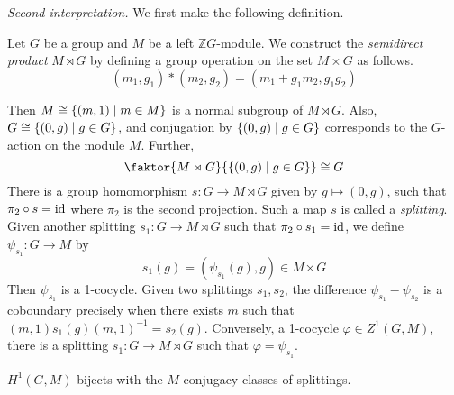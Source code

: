 \emph{Second interpretation.}
We first make the following definition.
\begin{definition}
    Let \( G \) be a group and \( M \) be a left \( \mathbb Z G \)-module.
    We construct the \emph{semidirect product} \( M \rtimes G \) by defining a group operation on the set \( M \times G \) as follows.
    \[ (m_1, g_1) \ast (m_2, g_2) = (m_1 + g_1 m_2, g_1 g_2) \]
\end{definition}
Then \( M \cong \qty{(m, 1) \mid m \in M} \) is a normal subgroup of \( M \rtimes G \).
Also, \( G \cong \qty{(0, g) \mid g \in G} \), and conjugation by \( \qty{(0, g) \mid g \in G} \) corresponds to the \( G \)-action on the module \( M \).
Further,
\[ \faktor{M \rtimes G}{\qty{(0, g) \mid g \in G}} \cong G \]
There is a group homomorphism \( s : G \to M \rtimes G \) given by \( g \mapsto (0, g) \), such that \( \pi_2 \circ s = \operatorname{id} \) where \( \pi_2 \) is the second projection.
Such a map \( s \) is called a \emph{splitting}.
Given another splitting \( s_1 : G \to M \rtimes G \) such that \( \pi_2 \circ s_1 = \operatorname{id} \), we define \( \psi_{s_1} : G \to M \) by
\[ s_1(g) = (\psi_{s_1}(g), g) \in M \rtimes G \]
Then \( \psi_{s_1} \) is a 1-cocycle.
Given two splittings \( s_1, s_2 \), the difference \( \psi_{s_1} - \psi_{s_2} \) is a coboundary precisely when there exists \( m \) such that \( (m, 1)s_1(g)(m,1)^{-1} = s_2(g) \).
Conversely, a 1-cocycle \( \varphi \in Z^1(G, M) \), there is a splitting \( s_1 : G \to M \rtimes G \) such that \( \varphi = \psi_{s_1} \).
\begin{theorem}
    \( H^1(G, M) \) bijects with the \( M \)-conjugacy classes of splittings.
\end{theorem}


